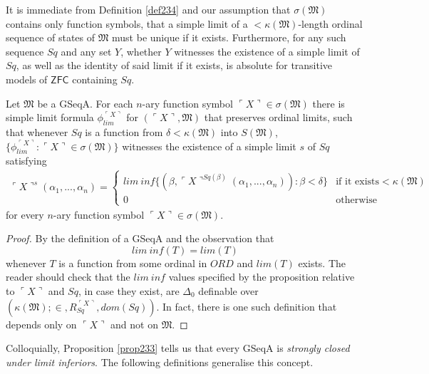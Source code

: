 \documentclass[12pt]{article}
\numberwithin{equation}{section}
\begin{document}
It is immediate from Definition \ref{def234} and our assumption that $\sigma(\mathfrak{M})$ contains only function symbols, that a simple limit of a $< \kappa(\mathfrak{M})$-length ordinal sequence of states of $\mathfrak{M}$ must be unique if it exists. Furthermore, for any such sequence $Sq$ and any set $Y$, whether $Y$ witnesses the existence of a simple limit of $Sq$, as well as the identity of said limit if it exists, is absolute for transitive models of $\mathsf{ZFC}$ containing $Sq$.

\begin{prop}\label{prop233}
Let $\mathfrak{M}$ be a GSeqA. For each $n$-ary function symbol $\ulcorner X \urcorner \in \sigma(\mathfrak{M})$ there is simple limit formula $\phi_{lim}^{\ulcorner X \urcorner}$ for $(\ulcorner X \urcorner, \mathfrak{M})$ that preserves ordinal limits, such that whenever $Sq$ is a function from $\delta < \kappa(\mathfrak{M})$ into $S(\mathfrak{M})$, $\{\phi_{lim}^{\ulcorner X \urcorner} : \ulcorner X \urcorner \in \sigma(\mathfrak{M})\}$ witnesses the existence of a simple limit $s$ of $Sq$ satisfying 
\begin{gather*}
    \ulcorner X \urcorner^{s} (\alpha_1, ..., \alpha_n) = 
    \begin{cases}
        lim \ inf \{(\beta, \ulcorner X \urcorner^{Sq(\beta)}(\alpha_1, ..., \alpha_n)) : \beta < \delta\} & \!\!\!\! \text{if it exists} < \kappa(\mathfrak{M}) \\
        0 & \!\!\!\! \text{otherwise}
    \end{cases} 
\end{gather*}
for every $n$-ary function symbol $\ulcorner X \urcorner \in \sigma(\mathfrak{M})$.
\end{prop}

\begin{proof}
By the definition of a GSeqA and the observation that 
\begin{equation*}
    lim \ inf (T) = lim (T)
\end{equation*}
whenever $T$ is a function from some ordinal in $ORD$ and $lim (T)$ exists. The reader should check that the $lim \ inf$ values specified by the proposition relative to $\ulcorner X \urcorner$ and $Sq$, in case they exist, are $\Delta_0$ definable over $(\kappa(\mathfrak{M}); \in, R_{Sq}^{\ulcorner X \urcorner}, dom(Sq))$. In fact, there is one such definition that depends only on $\ulcorner X \urcorner$ and not on $\mathfrak{M}$.
\end{proof}

Colloquially, Proposition \ref{prop233} tells us that every GSeqA is \emph{strongly closed under limit inferiors}. The following definitions generalise this concept.
\end{document}
